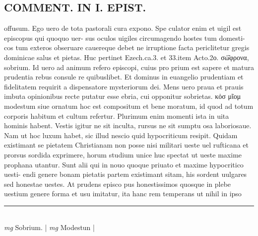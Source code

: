 \documentclass{article}
\begin{document}
\begin{pages}
\section*{COMMENT. IN I. EPIST. }\pstart offusum. Ego uero de tota pastorali cura expono. Spe culator enim et uigil est episcopus qui quoquo uer- sus oculos uigiles circumagendo hostes tum domesti- cos tum exteros obseruare cauereque debet ne irruptione facta periclitetur gregis dominicae salus et pietas. Huc pertinet Ezech.ca.3. et 33.item Acto.2ο. σώ͂φρονα, sobrium. Id uero ad animum refero episcopi, cuius pro prium est sapere et matura prudentia rebus consule re quibuslibet. Et dominus in euangelio prudentiam et fidelitatem requirit a dispensatore mysteriorum dei. Mens uero praua et prauis imbuta opinionibus recte putatur esse ebria, cui opponitur sobrietas. κὁσ μῖομ modestum siue ornatum hoc est compositum et bene moratum, id quod ad totum corporis habitum et cultum refertur. Plurimum enim momenti ista in uita hominis habent. Vestis igitur ne sit inculta, rursus ne sit sumptu osa laboriosaue. Nam ut hoc luxum habet, sic illud nescio quid hypocriticum resipit. Quidam existimant se pietatem Christianam non posse nisi militari ueste uel rufticana et prorsus sordida exprimere, horum studium unice huc spectat ut ueste maxime prophana utantur. Sunt alii qui in nouo quoque priuato et maxime hypocritico uesti- endi genere bonam pietatis partem existimant sitam, his sordent uulgares sed honestae uestes. At prudens episco pus honestissimos quosque in plebe uestium genere forma et usu imitatur, ita hanc rem temperans ut nihil in ipso  \pend
\vspace{0.5cm}\noindent
\vspace{0.2cm}\rule{1cm}{0.2pt}\\ 
\hspace{0.2cm}\textit{mg}
\footnotesize Sobrium. 
\normalsize| 
\hspace{0.2cm}\textit{mg}
\footnotesize Modestun 
\normalsize| 

\end{pages}
\end{document}
